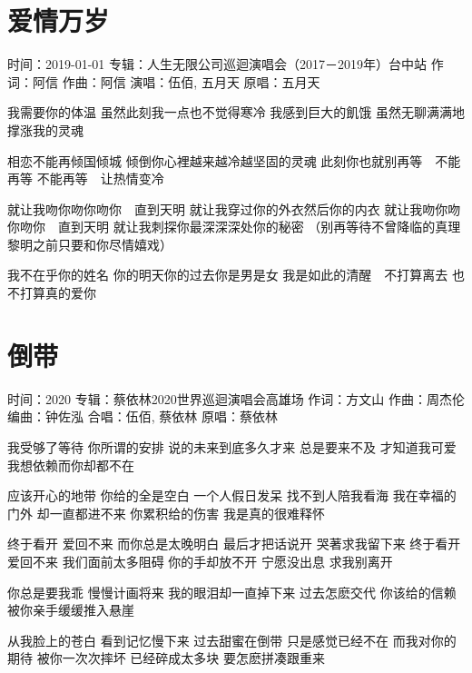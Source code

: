 \documentclass[UTF8,a4paper,oneside,twocolumn,12pt]{ctexbook}
\newcommand{\infopair}[2]{\textbullet #1：#2}
\newcommand{\zc}[1][伍佰]{\infopair{作词}{#1}}
\newcommand{\zq}[1][伍佰]{\infopair{作曲}{#1}}
\newcommand{\bq}[1][伍佰]{\infopair{编曲}{#1}}
\newcommand{\zj}[1]{\infopair{专辑}{#1}}
\newcommand{\yc}[1]{\infopair{原唱}{#1}}
\newcommand{\sj}[1]{\infopair{时间}{#1}}
\newenvironment{info}{\begin{flushleft}\kaishu
	}
	{\end{flushleft}\normalsize\yahei\par}
\newenvironment{lyric}{
	}
{}
\begin{document}
\section{爱情万岁}%
\begin{info}
	\sj{2019-01-01}
	\zj{人生无限公司巡迴演唱会（2017－2019年）台中站}
	\zc[阿信]
	\zq[阿信]
	\infopair{演唱}{伍佰, 五月天}
	\yc{五月天}
\end{info}
\begin{lyric}
	我需要你的体温
	虽然此刻我一点也不觉得寒冷
	我感到巨大的飢饿
	虽然无聊满满地撑涨我的灵魂

	相恋不能再倾国倾城
	倾倒你心裡越来越冷越坚固的灵魂
	此刻你也就别再等　不能再等
	不能再等　让热情变冷

	就让我吻你吻你吻你　直到天明
	就让我穿过你的外衣然后你的内衣
	就让我吻你吻你吻你　直到天明
	就让我刺探你最深深深处你的秘密
	（别再等待不曾降临的真理
	黎明之前只要和你尽情嬉戏）

	我不在乎你的姓名
	你的明天你的过去你是男是女
	我是如此的清醒　不打算离去
	也不打算真的爱你
\end{lyric}

\section{倒带}
\begin{info}
	\sj{2020}
	\zj{蔡依林2020世界巡迴演唱会高雄场}
	\zc[方文山]
	\zq[周杰伦]
	\bq[钟佐泓]
	\infopair{合唱}{伍佰, 蔡依林}
	\yc{蔡依林}
\end{info}
\begin{lyric}
	我受够了等待 你所谓的安排
	说的未来到底多久才来
	总是要来不及 才知道我可爱
	我想依赖而你却都不在

	应该开心的地带 你给的全是空白
	一个人假日发呆 找不到人陪我看海
	我在幸福的门外 却一直都进不来
	你累积给的伤害 我是真的很难释怀

	终于看开 爱回不来 而你总是太晚明白
	最后才把话说开 哭著求我留下来
	终于看开 爱回不来 我们面前太多阻碍
	你的手却放不开 宁愿没出息 求我别离开

	你总是要我乖 慢慢计画将来
	我的眼泪却一直掉下来
	过去怎麽交代 你该给的信赖
	被你亲手缓缓推入悬崖

	从我脸上的苍白 看到记忆慢下来
	过去甜蜜在倒带 只是感觉已经不在
	而我对你的期待 被你一次次摔坏
	已经碎成太多块 要怎麽拼凑跟重来
\end{lyric}
\end{document}
